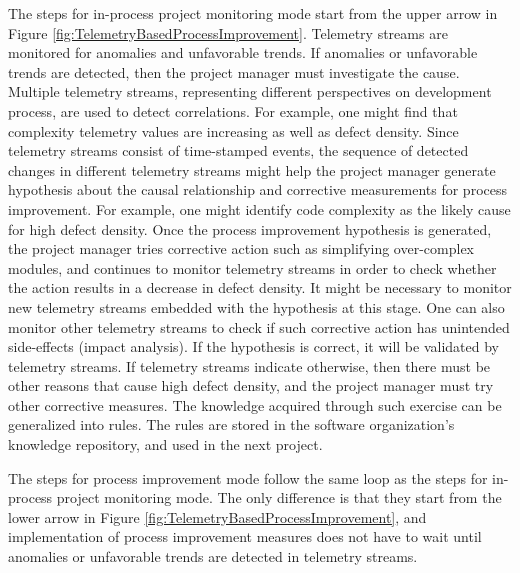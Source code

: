 The steps for in-process project monitoring mode start from the upper arrow in Figure \ref{fig:TelemetryBasedProcessImprovement}. Telemetry streams are monitored for anomalies and unfavorable trends. If anomalies or unfavorable trends are detected, then the project manager must investigate the cause. Multiple telemetry streams, representing different perspectives on development process, are used to detect correlations. For example, one might find that complexity telemetry values are increasing as well as defect density. Since telemetry streams consist of time-stamped events, the sequence of detected changes in different telemetry streams might help the project manager generate hypothesis about the causal relationship and corrective measurements for process improvement. For example, one might identify code complexity as the likely cause for high defect density. Once the process improvement hypothesis is generated, the project manager tries corrective action such as simplifying over-complex modules, and continues to monitor telemetry streams in order to check whether the action results in a decrease in defect density. It might be necessary to monitor new telemetry streams embedded with the hypothesis at this stage. One can also monitor other telemetry streams to check if such corrective action has unintended side-effects (impact analysis). If the hypothesis is correct, it will be validated by telemetry streams. If telemetry streams indicate otherwise, then there must be other reasons that cause high defect density, and the project manager must try other corrective measures. The knowledge acquired through such exercise can be generalized into rules. The rules are stored in the software organization's knowledge repository, and used in the next project.

The steps for process improvement mode follow the same loop as the steps for in-process project monitoring mode. The only difference is that they start from the lower arrow in Figure \ref{fig:TelemetryBasedProcessImprovement}, and implementation of process improvement measures does  not have to wait until anomalies or unfavorable trends are detected in telemetry streams. 



